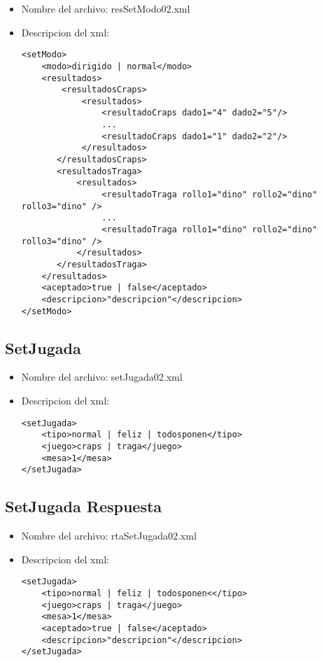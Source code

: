 \begin{itemize}
	\item Nombre del archivo: resSetModo02.xml
	\item Descripcion del xml:
		\begin{verbatim}
<setModo>
    <modo>dirigido | normal</modo>
    <resultados>
        <resultadosCraps>
            <resultados>
                <resultadoCraps dado1="4" dado2="5"/>
                ...
                <resultadoCraps dado1="1" dado2="2"/>
            </resultados>
       </resultadosCraps>
       <resultadosTraga>
           <resultados>
                <resultadoTraga rollo1="dino" rollo2="dino" rollo3="dino" />
                ...
                <resultadoTraga rollo1="dino" rollo2="dino" rollo3="dino" />
           </resultados>
       </resultadosTraga>
    </resultados>
    <aceptado>true | false</aceptado>
    <descripcion>"descripcion"</descripcion>
</setModo>
\end{verbatim}
\end{itemize}


\subsection{SetJugada}
\label{sec:SetJugada}

\begin{itemize}
	\item Nombre del archivo: setJugada02.xml
	\item Descripcion del xml:
		\begin{verbatim}
<setJugada>
    <tipo>normal | feliz | todosponen</tipo>
    <juego>craps | traga</juego>
    <mesa>1</mesa>
</setJugada>
\end{verbatim}
\end{itemize}

\subsection{SetJugada Respuesta}
\label{sec:SetJugadaRespuesta}

\begin{itemize}
	\item Nombre del archivo: rtaSetJugada02.xml
	\item Descripcion del xml:
		\begin{verbatim}
<setJugada>
    <tipo>normal | feliz | todosponen<</tipo>
    <juego>craps | traga</juego>
    <mesa>1</mesa>
    <aceptado>true | false</aceptado>			
    <descripcion>"descripcion"</descripcion>
</setJugada>
\end{verbatim}
\end{itemize}




